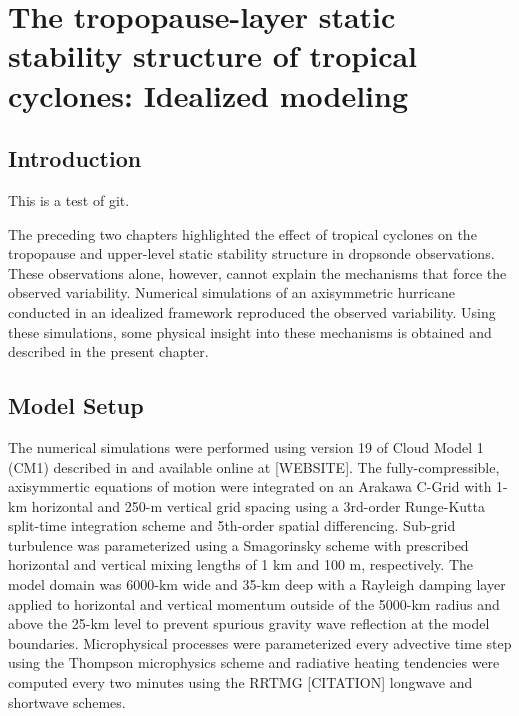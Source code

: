  
\chapter{The tropopause-layer static stability structure of tropical cyclones: Idealized modeling}
\resetfootnote %

\section{Introduction}

This is a test of git.

The preceding two chapters highlighted the effect of tropical cyclones on the tropopause and upper-level static stability structure in dropsonde observations.
These observations alone, however, cannot explain the mechanisms that force the observed variability.
Numerical simulations of an axisymmetric hurricane conducted in an idealized framework reproduced the observed variability.
Using these simulations, some physical insight into these mechanisms is obtained and described in the present chapter.

\section{Model Setup}

The numerical simulations were performed using version 19 of Cloud Model 1 (CM1) described in \cite{BryanRotunno} and available online at [WEBSITE].
The fully-compressible, axisymmertic equations of motion were integrated on an Arakawa C-Grid with 1-km horizontal and 250-m vertical grid spacing using a 3rd-order Runge-Kutta split-time integration scheme and 5th-order spatial differencing.
Sub-grid turbulence was parameterized using a Smagorinsky scheme with prescribed horizontal and vertical mixing lengths of 1 km and 100 m, respectively.
The model domain was 6000-km wide and 35-km deep with a Rayleigh damping layer applied to horizontal and vertical momentum outside of the 5000-km radius and above the 25-km level to prevent spurious gravity wave reflection at the model boundaries.
Microphysical processes were parameterized every advective time step using the Thompson microphysics scheme \cite{Thompson} and radiative heating tendencies were computed every two minutes using the RRTMG [CITATION] longwave and shortwave schemes. 
 

